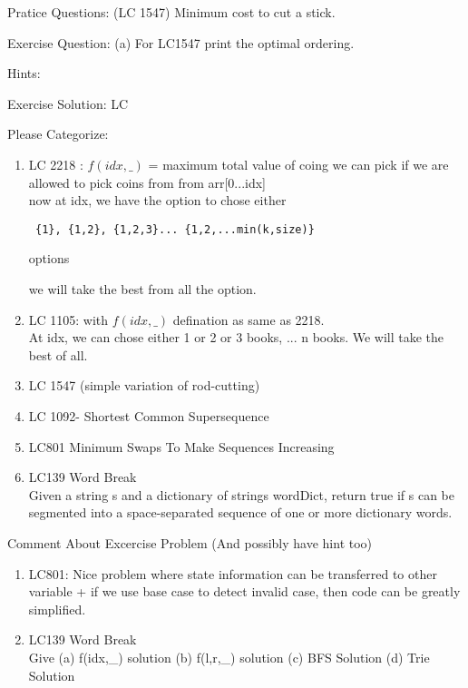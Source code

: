 









\vspace{3cm}



Pratice Questions:
(LC 1547) Minimum cost to cut a stick.

Exercise Question:
(a) For LC1547 print the optimal ordering.

Hints: \label{hints}
\unvbox\hints


Exercise Solution:
LC

Please Categorize:
\begin{enumerate}
    \item 
     LC 2218 : $f(idx,\_)$ = maximum total value of coing we can pick if we are allowed to pick coins from from arr[0...idx]\\
     now at idx, we have the option to chose either \begin{verbatim} {1}, {1,2}, {1,2,3}... {1,2,...min(k,size)} \end{verbatim} options
        
     we will take the best from all the option.
    
     \item LC 1105: with $f(idx,\_)$ defination as same as 2218.\\
     At idx, we can chose either 1 or 2 or 3 books, ... n books. We will take the best of all.

     \item LC 1547 (simple variation of rod-cutting)
     \item LC 1092- Shortest Common Supersequence
     \item LC801 Minimum Swaps To Make Sequences Increasing 
     \item LC139 Word Break\\ Given a string s and a dictionary of strings wordDict, return true if s can be segmented into a space-separated sequence of one or more dictionary words.
\end{enumerate}

\vspace{5cm}
Comment About Excercise Problem (And possibly have hint too)
\begin{enumerate}
    \item LC801: Nice problem where state information can be transferred to other variable + if we use base case to detect invalid case, then code can be greatly simplified.
    \item LC139 Word Break \\Give (a) f(idx,\_) solution (b) f(l,r,\_) solution (c) BFS Solution (d) Trie Solution
\end{enumerate}
